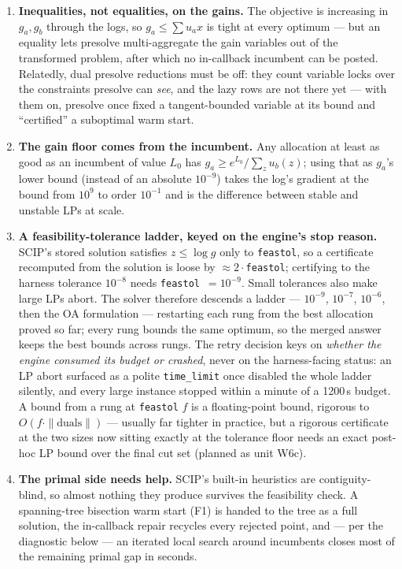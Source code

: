 \documentclass[11pt]{article}
\theoremstyle{definition}
\newcommand{\ga}{g_a}
\newcommand{\gb}{g_b}
\newcommand{\ua}{u_a}
\newcommand{\ub}{u_b}
\begin{document}
\begin{enumerate}
\item \textbf{Inequalities, not equalities, on the gains.} The objective is increasing
in $\ga,\gb$ through the logs, so $\ga\le\sum\ua x$ is tight at every optimum --- but an
equality lets presolve multi-aggregate the gain variables out of the transformed
problem, after which no in-callback incumbent can be posted. Relatedly, dual presolve
reductions must be off: they count variable locks over the constraints presolve can
\emph{see}, and the lazy rows are not there yet --- with them on, presolve once fixed a
tangent-bounded variable at its bound and ``certified'' a suboptimal warm start.
\item \textbf{The gain floor comes from the incumbent.} Any allocation at least as good
as an incumbent of value $L_0$ has $\ga \ge e^{L_0}/\sum_z\ub(z)$; using that as
$\ga$'s lower bound (instead of an absolute $10^{-9}$) takes the log's gradient at the
bound from $10^9$ to order $10^{-1}$ and is the difference between stable and unstable
LPs at scale.
\item \textbf{A feasibility-tolerance ladder, keyed on the engine's stop reason.} SCIP's
stored solution satisfies $z\le\log g$ only to \texttt{feastol}, so a certificate
recomputed from the solution is loose by ${\approx}2\cdot$\texttt{feastol}; certifying
to the harness tolerance $10^{-8}$ needs \texttt{feastol}~$=10^{-9}$. Small tolerances
also make large LPs abort. The solver therefore descends a ladder ---
$10^{-9}$, $10^{-7}$, $10^{-6}$, then the OA formulation --- restarting each rung from
the best allocation proved so far; every rung bounds the same optimum, so the merged
answer keeps the best bounds across rungs. The retry decision keys on \emph{whether the
engine consumed its budget or crashed}, never on the harness-facing status: an LP abort
surfaced as a polite \texttt{time\_limit} once disabled the whole ladder silently, and
every large instance stopped within a minute of a 1200\,s budget. A bound from a rung at
\texttt{feastol} $f$ is a floating-point bound, rigorous to $O(f\cdot\|\text{duals}\|)$
--- usually far tighter in practice, but a rigorous certificate at the two sizes now
sitting exactly at the tolerance floor needs an exact post-hoc LP bound over the final
cut set (planned as unit W6c).
\item \textbf{The primal side needs help.} SCIP's built-in heuristics are
contiguity-blind, so almost nothing they produce survives the feasibility check. A
spanning-tree bisection warm start (F1) is handed to the tree as a full solution, the
in-callback repair recycles every rejected point, and --- per the diagnostic below ---
an iterated local search around incumbents closes most of the remaining primal gap in
seconds.
\end{enumerate}
\end{document}
